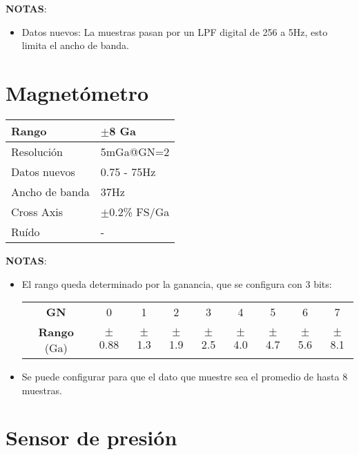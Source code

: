 \textbf{NOTAS}:
\begin{itemize}
\item Datos nuevos: La muestras pasan por un LPF digital de 256 a 5Hz, esto limita el ancho de banda.
\end{itemize}

\section{Magnet\'ometro}

\begin{table}[H]
\begin{center}
\begin{tabular}{|p{3cm}|p{6.5cm}|}
\hline
Rango & $\pm$8 Ga\\
\hline
Resoluci\'on &  5mGa@GN=2\\
\hline
Datos nuevos &  0.75 - 75Hz\\
\hline
Ancho de banda &  37Hz\\
\hline
Cross Axis & $\pm$0.2\% FS/Ga \\
\hline
Ru\'ido & - \\
\hline
\end{tabular}
\label{tab:magn}
\end{center}
\end{table}

\newpage
\textbf{NOTAS}:
\begin{itemize}
\item El rango queda determinado por la ganancia, que se configura con 3 bits:
\begin{table}[H]
\begin{center}
\begin{tabular}{|c|c|c|c|c|c|c|c|c|}
\hline
\textbf{GN} & 0 & 1 & 2 & 3 & 4 & 5 & 6 & 7 \\
\textbf{Rango} (Ga)& $\pm$0.88 & $\pm$1.3 & $\pm$1.9 & $\pm$2.5 & $\pm$4.0 & $\pm$4.7 & $\pm$5.6 & $\pm$8.1 \\
\hline
\end{tabular}
\label{tab:magn-gain}
\end{center}
\end{table}
\item Se puede configurar para que el dato que muestre sea el promedio de hasta 8 muestras.
\end{itemize}

\section{Sensor de presi\'on}

